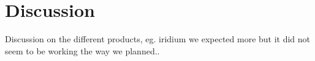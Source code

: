 \chapter{Discussion}\label{Chapter:Discussion}
\noindent

Discussion on the different products, eg. iridium we expected more but it did not seem to be working the way we planned.. 




